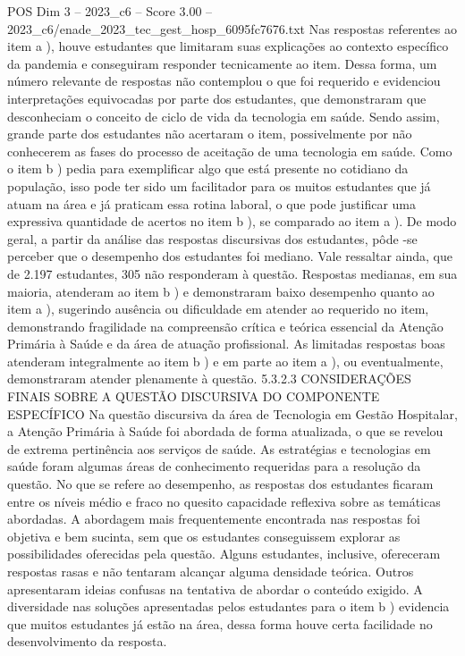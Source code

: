 \begin{textsample}{POS Dim 3 – 2023\_c6 – Score 3.00 – 2023\_c6/enade\_2023\_tec\_gest\_hosp\_6095fc7676.txt}
Nas respostas referentes ao item a ), houve estudantes que limitaram suas explicações ao contexto específico da pandemia e conseguiram responder tecnicamente ao item.
Dessa forma, um número relevante de respostas não contemplou o que foi requerido e evidenciou interpretações equivocadas por parte dos estudantes, que demonstraram que desconheciam o conceito de ciclo de vida da tecnologia em saúde.
Sendo assim, grande parte dos estudantes não acertaram o item, possivelmente por não conhecerem as fases do processo de aceitação de uma tecnologia em saúde.
Como o item b ) pedia para exemplificar algo que está presente no cotidiano da população, isso pode ter sido um facilitador para os muitos estudantes que já atuam na área e já praticam essa rotina laboral, o que pode justificar uma expressiva quantidade de acertos no item b ), se comparado ao item a ).
De modo geral, a partir da análise das respostas discursivas dos estudantes, pôde -se perceber que o desempenho dos estudantes foi mediano.
Vale ressaltar ainda, que de 2.197 estudantes, 305 não responderam à questão.
Respostas medianas, em sua maioria, atenderam ao item b ) e demonstraram baixo desempenho quanto ao item a ), sugerindo ausência ou dificuldade em atender ao requerido no item, demonstrando fragilidade na compreensão crítica e teórica essencial da Atenção Primária à Saúde e da área de atuação profissional.
As limitadas respostas boas atenderam integralmente ao item b ) e em parte ao item a ), ou eventualmente, demonstraram atender plenamente à questão. 5.3.2.3 CONSIDERAÇÕES FINAIS SOBRE A QUESTÃO DISCURSIVA DO COMPONENTE ESPECÍFICO Na questão discursiva da área de Tecnologia em Gestão Hospitalar, a Atenção Primária à Saúde foi abordada de forma atualizada, o que se revelou de extrema pertinência aos serviços de saúde.
As estratégias e tecnologias em saúde foram algumas áreas de conhecimento requeridas para a resolução da questão.
No que se refere ao desempenho, as respostas dos estudantes ficaram entre os níveis médio e fraco no quesito capacidade reflexiva sobre as temáticas abordadas.
A abordagem mais frequentemente encontrada nas respostas foi objetiva e bem sucinta, sem que os estudantes conseguissem explorar as possibilidades oferecidas pela questão.
Alguns estudantes, inclusive, ofereceram respostas rasas e não tentaram alcançar alguma densidade teórica.
Outros apresentaram ideias confusas na tentativa de abordar o conteúdo exigido.
A diversidade nas soluções apresentadas pelos estudantes para o item b ) evidencia que muitos estudantes já estão na área, dessa forma houve certa facilidade no desenvolvimento da resposta.

\end{textsample}
